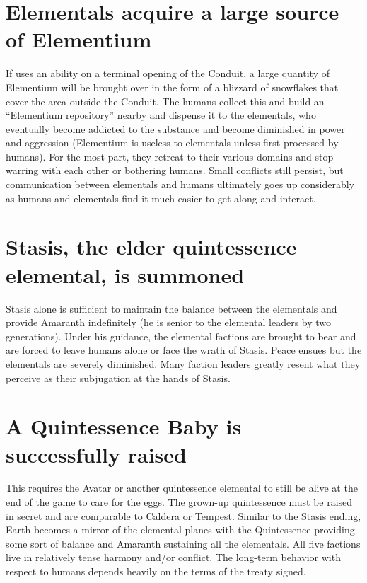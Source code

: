 \documentclass[green]{elementals}
\begin{document}
\section{Elementals acquire a large source of Elementium}

If \cScientist{\intro} uses an ability on a terminal opening of the Conduit, a large quantity of Elementium will be brought over in the form of a blizzard of snowflakes that cover the area outside the Conduit. The humans collect this and build an ``Elementium repository'' nearby and dispense it to the elementals, who eventually become addicted to the substance and become diminished in power and aggression (Elementium is useless to elementals unless first processed by humans). For the most part, they retreat to their various domains and stop warring with each other or bothering humans. Small conflicts still persist, but communication between elementals and humans ultimately goes up considerably as humans and elementals find it much easier to get along and interact.

\section{Stasis, the elder quintessence elemental, is summoned}

Stasis alone is sufficient to maintain the balance between the elementals and provide Amaranth indefinitely (he is senior to the elemental leaders by two generations). Under his guidance, the elemental factions are brought to bear and are forced to leave humans alone or face the wrath of Stasis. Peace ensues but the elementals are severely diminished. Many faction leaders greatly resent what they perceive as their subjugation at the hands of Stasis.

\section{A Quintessence Baby is successfully raised}

This requires the Avatar or another quintessence elemental to still be alive at the end of the game to care for the eggs. The grown-up quintessence must be raised in secret and are comparable to Caldera or Tempest. Similar to the Stasis ending, Earth becomes a mirror of the elemental planes with the Quintessence providing some sort of balance and Amaranth sustaining all the elementals. All five factions live in relatively tense harmony and/or conflict. The long-term behavior with respect to humans depends heavily on the terms of the treaty signed.
\end{document}
